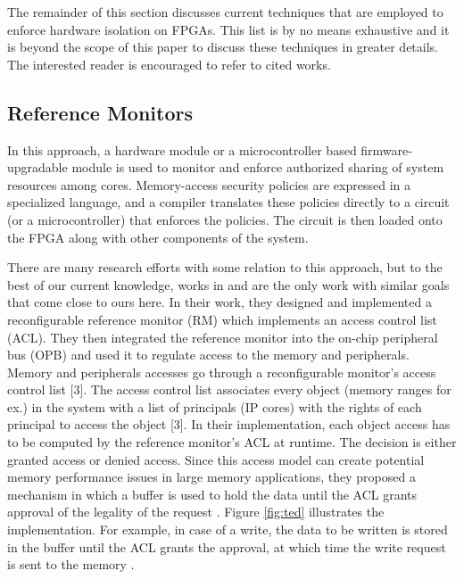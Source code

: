 \documentclass[sigconf]{acmart}
\theoremstyle{plain}
\theoremstyle{remark}
\begin{document}
The remainder of this section discusses current techniques that are employed to enforce hardware isolation on FPGAs. This list is by no means exhaustive and it is beyond the scope of this paper to discuss these techniques in greater details. The interested reader is encouraged to refer to cited works.

\subsection{Reference Monitors}

In this approach, a hardware module or a microcontroller based firmware-upgradable module is used to monitor and enforce authorized sharing of system
resources among cores. Memory-access security policies are expressed in a specialized language, and a compiler translates these policies directly to a circuit (or a microcontroller) that enforces the policies. The circuit is then loaded onto the FPGA along with other components of the system.

There are many research efforts with some relation to this approach, but to the best of our current knowledge, works in \cite{HuffEmbedded} and \cite{Huffmire} are the only work with similar goals that come close to ours here. In their work, they designed and implemented a reconfigurable reference monitor (RM) which implements an access control list (ACL). They then integrated the reference monitor into the on-chip peripheral bus (OPB) and used it to regulate access to the memory and peripherals. Memory and peripherals accesses go through a reconfigurable monitor's access control list [3]. The access control list associates every object (memory ranges for ex.) in the system with a list of principals (IP cores) with the rights of each principal to access the object [3]. In their implementation, each object access has to be computed by the reference monitor's ACL at runtime. The decision is either granted access or denied access. Since this access model can create potential memory performance issues in large memory applications, they proposed a mechanism in which a buffer is used to hold the data until the ACL grants approval of the legality of the request \cite{SPHuffmire}. Figure \ref{fig:ted} illustrates the implementation. For example, in case of a write, the data to be written is stored in the buffer until the ACL grants the approval, at which time the write request is sent to the memory \cite{SPHuffmire}.
\end{document}
